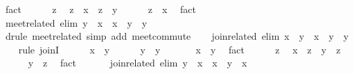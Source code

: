 \begin{isabellebody}
\ fact\isanewline
\ \ \ \ \isamarkupfalse%
\ z\ \isamarkupfalse%
\ {\isachardoublequoteopen}z\ {\isasymsqsubseteq}\ x{\isachardoublequoteclose}\ \ {\isachardoublequoteopen}z\ {\isasymsqsubseteq}\ y{\isachardoublequoteclose}\isanewline
\ \ \ \ \isamarkupfalse%
\ {\isachardoublequoteopen}z\ {\isasymsqsubseteq}\ x{\isachardoublequoteclose}\ \isamarkupfalse%
\ fact\isanewline
\ \ \isamarkupfalse%
\isanewline
\isanewline
\ \ \isamarkupfalse%
\ meet{\isacharunderscore}related{}\ {\isacharbrackleft}elim{\isacharquery}{\isacharbrackright}{\isacharcolon}\ {\isachardoublequoteopen}y\ {\isasymsqsubseteq}\ x\ {\isasymLongrightarrow}\ x\ {\isasymsqinter}\ y\ {\isacharequal}\ y{\isachardoublequoteclose}\isanewline
\ \ \ \ \isamarkupfalse%
\ {\isacharparenleft}drule\ meet{\isacharunderscore}related{\isacharparenright}\ {\isacharparenleft}simp\ add{\isacharcolon}\ meet{\isacharunderscore}commute{\isacharparenright}\isanewline
\isanewline
\ \ \isamarkupfalse%
\ join{\isacharunderscore}related\ {\isacharbrackleft}elim{\isacharquery}{\isacharbrackright}{\isacharcolon}\ {\isachardoublequoteopen}x\ {\isasymsqsubseteq}\ y\ {\isasymLongrightarrow}\ x\ {\isasymsqunion}\ y\ {\isacharequal}\ y{\isachardoublequoteclose}\isanewline
\ \ \isamarkupfalse%
\ {\isacharparenleft}rule\ joinI{\isacharparenright}\isanewline
\ \ \ \ \isamarkupfalse%
\ {\isachardoublequoteopen}x\ {\isasymsqsubseteq}\ y{\isachardoublequoteclose}\isanewline
\ \ \ \ \isamarkupfalse%
\ {\isachardoublequoteopen}y\ {\isasymsqsubseteq}\ y{\isachardoublequoteclose}\ \isacommand{{\isachardot}{\isachardot}}\isamarkupfalse%
\isanewline
\ \ \ \ \isamarkupfalse%
\ {\isachardoublequoteopen}x\ {\isasymsqsubseteq}\ y{\isachardoublequoteclose}\ \isamarkupfalse%
\ fact\isanewline
\ \ \ \ \isamarkupfalse%
\ z\ \isamarkupfalse%
\ {\isachardoublequoteopen}x\ {\isasymsqsubseteq}\ z{\isachardoublequoteclose}\ \ {\isachardoublequoteopen}y\ {\isasymsqsubseteq}\ z{\isachardoublequoteclose}\isanewline
\ \ \ \ \isamarkupfalse%
\ {\isachardoublequoteopen}y\ {\isasymsqsubseteq}\ z{\isachardoublequoteclose}\ \isamarkupfalse%
\ fact\isanewline
\ \ \isamarkupfalse%
\isanewline
\isanewline
\ \ \isamarkupfalse%
\ join{\isacharunderscore}related{}\ {\isacharbrackleft}elim{\isacharquery}{\isacharbrackright}{\isacharcolon}\ {\isachardoublequoteopen}y\ {\isasymsqsubseteq}\ x\ {\isasymLongrightarrow}\ x\ {\isasymsqunion}\ y\ {\isacharequal}\ x{\isachardoublequoteclose}\isanewline

\end{isabellebody}
